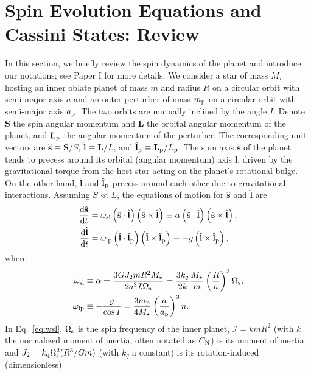 \documentclass[
        fleqn,
        usenatbib,
        referee
    ]{mnras}
\newcommand*{\rd}[2]{\frac{\mathrm{d}#1}{\mathrm{d}#2}}
\newcommand*{\p}[1]{\left(#1\right)}
\newcommand*{\bm}[1]{\mathbf{#1}}
\newcommand*{\uv}[1]{\hat{\boldsymbol{\mathbf{#1}}}}
\begin{document}
\section{Spin Evolution Equations and Cassini States: Review}\label{s:theory}

In this section, we briefly review the spin dynamics of the planet and introduce
our notations; see Paper I for more details. We consider a star of mass
$M_\star$ hosting an inner oblate planet of mass $m$ and radius $R$ on a
circular orbit with semi-major axis $a$ and an outer perturber of mass $m_{\rm
p}$ on a circular orbit with semi-major axis $a_{\rm p}$. The two orbits are
mutually inclined by the angle $I$. Denote $\bm{S}$ the spin angular momentum
and $\bm{L}$ the orbital angular momentum of the planet, and $\bm{L}_{\rm p}$
the angular momentum of the perturber. The corresponding unit vectors are
$\uv{s} \equiv \bm{S} / S$, $\uv{l} \equiv \bm{L} / L$, and $\uv{l}_{\rm p}
\equiv \bm{L}_{\rm p} / L_{\rm p}$. The spin axis $\uv{s}$ of the planet tends
to precess around its orbital (angular momentum) axis $\uv{l}$, driven by the
gravitational torque from the host star acting on the planet's rotational bulge.
On the other hand, $\uv{l}$ and $\uv{l}_{\rm p}$ precess around
each other due to gravitational interactions. Assuming $S \ll L$,
the equations of motion for $\uv{s}$ and $\uv{l}$ are
\begin{align}
    \rd{\uv{s}}{t}
        &= \omega_{\rm sl}\p{\uv{s} \cdot \uv{l}}\p{\uv{s} \times \uv{l}}
        \equiv \alpha\p{\uv{s} \cdot \uv{l}}\p{\uv{s} \times
        \uv{l}},\label{eq:dsdt1}\\
    \rd{\uv{l}}{t} &= \omega_{\rm lp}\p{\uv{l} \cdot \uv{l}_{\rm p}}\p{\uv{l}
        \times \uv{l}_{\rm p}} \equiv -g\p{\uv{l} \times \uv{l}_{\rm p}},
        \label{eq:dldt1}
\end{align}
where
\begin{align}
    \omega_{\rm sl} &\equiv \alpha =
        \frac{3GJ_2 mR^2 M_\star}{2a^3 \mathcal{I}\Omega_{\rm s}}
        = \frac{3k_q}{2k}\frac{M_\star}{m}\p{\frac{R}{a}}^3 \Omega_{\rm s},
            \label{eq:wsl}\\
    \omega_{\rm lp} &\equiv -\frac{g}{\cos I}
        = \frac{3m_{\rm p}}{4M_\star}\p{\frac{a}{a_{\rm p}}}^3 n.\label{eq:wlp}
\end{align}
In Eq.~\eqref{eq:wsl}, $\Omega_{\rm s}$ is the spin frequency of the inner
planet, $\mathcal{I} = k mR^2$ (with $k$ the normalized moment of inertia, often
notated as $C_{\rm N}$) is its moment of inertia and $J_2 = k_{\rm q}\Omega_{\rm
s}^2 (R^3/Gm)$ (with $k_{q}$ a constant) is its rotation-induced (dimensionless)
\end{document}
